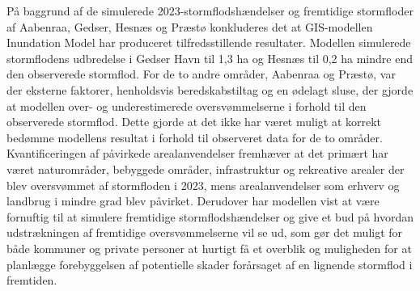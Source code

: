 
 




På baggrund af de simulerede 2023-stormflodshændelser og fremtidige stormfloder af Aabenraa, Gedser, Hesnæs og Præstø konkluderes det at GIS-modellen Inundation Model har produceret  tilfredsstillende resultater. 
Modellen simulerede stormflodens udbredelse i Gedser Havn til 1,3 ha og Hesnæs til 0,2 ha mindre end den observerede stormflod. For de to andre områder, Aabenraa og Præstø, var der eksterne faktorer, henholdsvis beredskabstiltag og en ødelagt sluse, der gjorde at modellen over- og underestimerede oversvømmelserne i forhold til den observerede stormflod. Dette gjorde at det ikke har været muligt at korrekt bedømme modellens resultat i forhold til observeret data for de to områder.\\
Kvantificeringen af påvirkede arealanvendelser fremhæver at det primært har været naturområder, bebyggede områder, infrastruktur og rekreative arealer der blev oversvømmet af stormfloden i 2023, mens arealanvendelser som erhverv og landbrug i mindre grad blev påvirket. Derudover har modellen vist at være fornuftig til at simulere fremtidige stormflodshændelser og give et bud på hvordan udstrækningen af fremtidige oversvømmelserne vil se ud, som gør det muligt for både kommuner og private personer at hurtigt få et overblik og muligheden for at planlægge forebyggelsen af potentielle skader forårsaget af en lignende stormflod i fremtiden.\\

